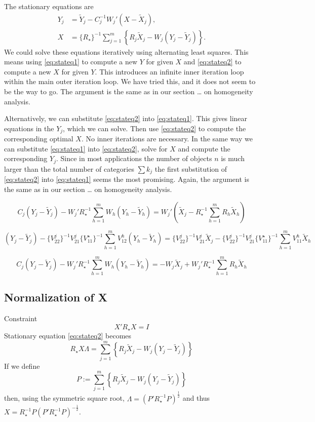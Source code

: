 \documentclass[
  12pt,
]{article}
\begin{document}
The stationary equations are
\begin{align}
Y_j&=\tilde Y_j-C_j^{-1}W_j'(X-\tilde X_j),\label{eq:stateq1}\\
X&=\{R_\star\}^{-1}\sum_{j=1}^m\left\{R_j\tilde X_j-W_j(Y_j-\tilde Y_j)\right\}.\label{eq:stateq2}
\end{align}
We could solve these equations iteratively using alternating least squares. This
means using \eqref{eq:stateq1} to compute a new \(Y\) for given \(X\) and \eqref{eq:stateq2} to compute a new \(X\) for given \(Y\). This introduces an
infinite inner iteration loop within the main outer iteration loop. We have tried this, and it does not seem to be the way to go. The argument is the same as in
our section \ldots{} on homogeneity analysis.

Alternatively, we can substitute \eqref{eq:stateq2} into \eqref{eq:stateq1}. This
gives linear equations in the \(Y_j\), which we can solve. Then use \eqref{eq:stateq2}
to compute the corresponding optimal \(X\). No inner iterations are necessary.
In the same way we can substitute \eqref{eq:stateq1} into \eqref{eq:stateq2}, solve for
\(X\) and compute the corresponding \(Y_j\). Since in most applications the number of
objects \(n\) is much larger than the total number of categories \(\sum k_j\) the first
substitution of \eqref{eq:stateq2} into \eqref{eq:stateq1} seems the most
promising. Again, the argument is the same as in
our section \ldots{} on homogeneity analysis.

\[
C_j(Y_j-\tilde Y_j)-W_j'R_\star^{-1}\sum_{h=1}^mW_h(Y_h-\tilde Y_h)=W_j'(\tilde X_j-R_\star^{-1}\sum_{h=1}^mR_h\tilde X_h)
\]

\[
(Y_j-\tilde Y_j)-\{V_{22}^j\}^{-1}V_{21}^j\{V_{11}^\star\}^{-1}\sum_{h=1}^mV_{12}^h(Y_h-\tilde Y_h)=\{V_{22}^j\}^{-1}V_{21}^j\tilde X_j-\{V_{22}^j\}^{-1}V_{21}^j\{V_{11}^\star\}^{-1}\sum_{h=1}^mV_{11}^h\tilde X_h
\]

\[
C_j(Y_j-\tilde Y_j)-W_j'R_\star^{-1}\sum_{h=1}^mW_h(Y_h-\tilde Y_h)=-W_j\tilde X_j+W_j'R_\star^{-1}\sum_{h=1}^mR_h\tilde X_h
\]

\subsection{Normalization of X}\label{normalization-of-x}

Constraint
\[
X'R_\star X = I
\]
Stationary equation \eqref{eq:stateq2} becomes
\[
R_\star X\Lambda =\sum_{j=1}^m\left\{R_j\tilde X_j-W_j(Y_j-\tilde Y_j)\right\}
\]
If we define
\[
P:=\sum_{j=1}^m\left\{R_j\tilde X_j-W_j(Y_j-\tilde Y_j)\right\}
\]
then, using the symmetric square root, \(\Lambda=(P'R_\star^{-1}P)^\frac12\) and thus \(X=R_\star^{-1}P(P'R_\star^{-1}P)^{-\frac12}\).
\end{document}
